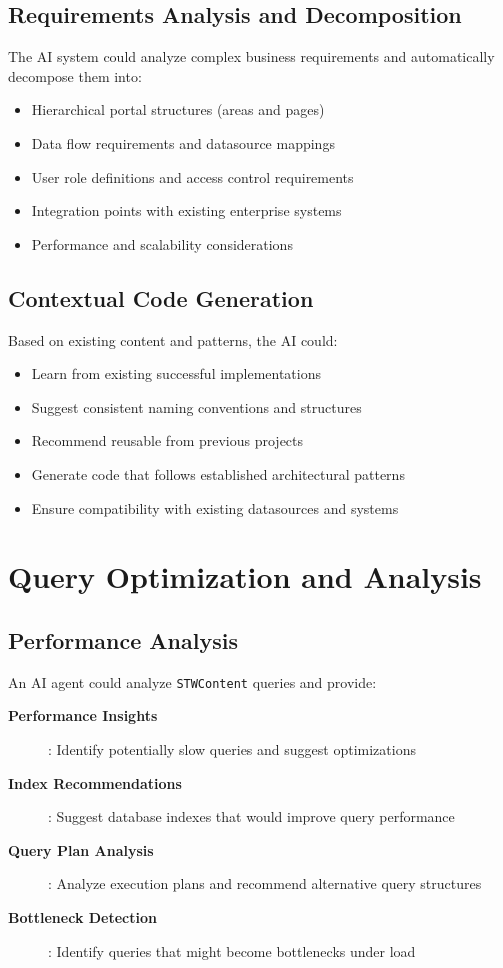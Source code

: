 \subsection{Requirements Analysis and Decomposition}

The AI system could analyze complex business requirements and automatically decompose them into:
\begin{itemize}
\item Hierarchical portal structures (areas and pages)
\item Data flow requirements and datasource mappings
\item User role definitions and access control requirements
\item Integration points with existing enterprise systems
\item Performance and scalability considerations
\end{itemize}

\subsection{Contextual Code Generation}

Based on existing \webbase{} content and patterns, the AI could:
\begin{itemize}
\item Learn from existing successful implementations
\item Suggest consistent naming conventions and structures
\item Recommend reusable  from previous projects
\item Generate code that follows established architectural patterns
\item Ensure compatibility with existing datasources and systems
\end{itemize}

\section{Query Optimization and Analysis}
\label{sec:query-optimization}

\subsection{Performance Analysis}

An AI agent could analyze \texttt{STWContent} queries and provide:

\begin{description}
\item[\textbf{Performance Insights}]: Identify potentially slow queries and suggest optimizations
\item[\textbf{Index Recommendations}]: Suggest database indexes that would improve query performance
\item[\textbf{Query Plan Analysis}]: Analyze execution plans and recommend alternative query structures
\item[\textbf{Bottleneck Detection}]: Identify queries that might become bottlenecks under load
\end{description}

